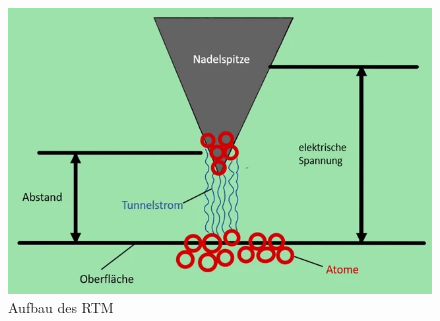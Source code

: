 \begin{figure}[H]
\centering
\includegraphics[width=\linewidth]{figs/RTM}
\caption{Aufbau des RTM \cite{RTM}}
\label{fig:RTM}
\end{figure}

